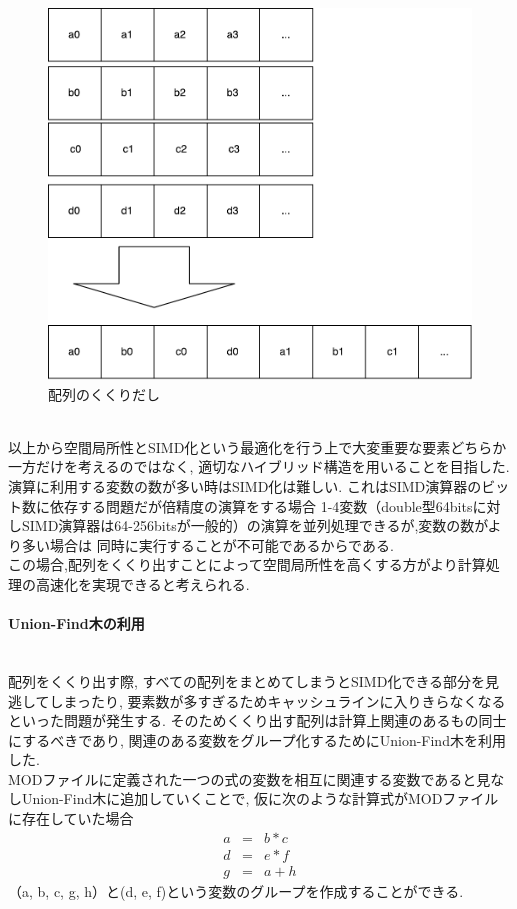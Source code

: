 \begin{figure}[htb]
  \begin{center}
    \includegraphics[width=1.1\textwidth]{./images/MERGE-ARRAY.pdf}
    \caption{配列のくくりだし}
    \label{fig:merge-array}
  \end{center}
\end{figure}~\\
以上から空間局所性とSIMD化という最適化を行う上で大変重要な要素どちらか一方だけを考えるのではなく,
適切なハイブリッド構造を用いることを目指した.\\
演算に利用する変数の数が多い時はSIMD化は難しい. これはSIMD演算器のビット数に依存する問題だが倍精度の演算をする場合
1-4変数（double型64bitsに対しSIMD演算器は64-256bitsが一般的）の演算を並列処理できるが,変数の数がより多い場合は
同時に実行することが不可能であるからである.\\
この場合,配列をくくり出すことによって空間局所性を高くする方がより計算処理の高速化を実現できると考えられる.\\

\paragraph{Union-Find木の利用}~\\
配列をくくり出す際, すべての配列をまとめてしまうとSIMD化できる部分を見逃してしまったり,
要素数が多すぎるためキャッシュラインに入りきらなくなるといった問題が発生する.
そのためくくり出す配列は計算上関連のあるもの同士にするべきであり, 関連のある変数をグループ化するためにUnion-Find木を利用した.\\
MODファイルに定義された一つの式の変数を相互に関連する変数であると見なしUnion-Find木に追加していくことで, 仮に次のような計算式がMODファイルに存在していた場合
\begin{eqnarray}
  a &=& b * c\\
  d &=& e * f\\
  g &=& a + h
\label{eq:3x0}
\end{eqnarray}
（a, b, c, g, h）と(d, e, f)という変数のグループを作成することができる.\\

